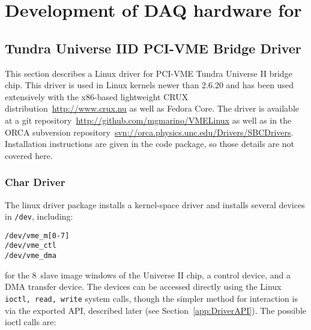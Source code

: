 
\chapter{Development of DAQ hardware for \MJ}
\label{app:ORCASoftwareChapter}

	\section{Tundra Universe IID PCI-VME Bridge Driver}
	\label{sec:TundraUniverse}

This section describes a Linux driver for PCI-VME Tundra Universe II bridge chip.  This
driver is used in Linux kernels newer than 2.6.20 and has been used extensively with the 
x86-based lightweight CRUX distribution~\url{http://www.crux.nu} as well as Fedora Core.  The driver is available
at a git repository~\url{http://github.com/mgmarino/VMELinux} as well as in the ORCA subversion
repository~\url{svn://orca.physics.unc.edu/Drivers/SBCDrivers}.  Installation instructions
are given in the code package, so those details are not covered here.

		\subsection{Char Driver}

The linux driver package installs a kernel-space driver and installs several devices in 
\lstinline!/dev!, including:
		\begin{lstlisting}
/dev/vme_m[0-7]
/dev/vme_ctl
/dev/vme_dma
		\end{lstlisting}
for the 8~slave image windows of the Universe II chip, a control device, and a DMA transfer device.  The devices can be accessed directly using the Linux \lstinline!ioctl, read, write! 
system calls, though the simpler method for interaction is via the exported API, described later (see Section~\ref{app:DriverAPI}).  The possible ioctl calls are:


